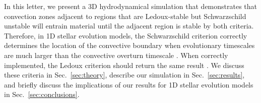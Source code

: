 In this letter, we present a 3D hydrodynamical simulation that demonstrates that convection zones adjacent to regions that are Ledoux-stable but Schwarzschild unstable will entrain material until the adjacent region is stable by both criteria.
Therefore, in 1D stellar evolution models, the Schwarzschild criterion correctly determines the location of the convective boundary when evolutionary timescales are much larger than the convective overturn timescale \citep[e.g., on the main sequence;][]{georgy_etal_2021}.
When correctly implemented, the Ledoux criterion should return the same result \citep{gabriel_etal_2014}.
We discuss these criteria in Sec.~\ref{sec:theory}, describe our simulation in Sec.~\ref{sec:results}, and briefly discuss the implications of our results for 1D stellar evolution models in Sec.~\ref{sec:conclusions}.
